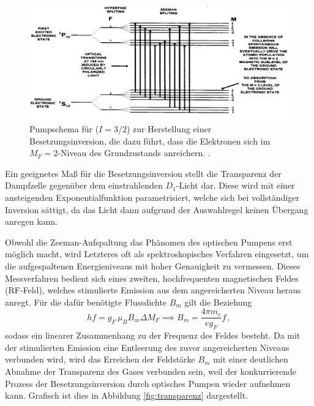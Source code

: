  \begin{figure}
    \centering
    \includegraphics[width=\textwidth]{pictures/pumpschema.png}
    \caption{Pumpschema für  ($I=3/2$) zur Herstellung einer Besetzungsinversion, die dazu führt, dass die Elektronen sich im $M_F=2$-Niveau des Grundzustands anreichern. \cite{caltech}.}
    \label{fig:pumpschema}
  \end{figure}

  Ein geeignetes Maß für die Besetzungsinversion stellt die Transparenz der Dampfzelle gegenüber dem einstrahlenden $D_1$-Licht dar. Diese wird mit einer ansteigenden Exponentialfunktion parametrisiert, welche sich bei vollständiger Inversion sättigt, da das Licht dann aufgrund der Auswahlregel keinen Übergang anregen kann.

  Obwohl die Zeeman-Aufspaltung das Phänomen des optischen Pumpens erst möglich macht, wird Letzteres oft als spektroskopisches Verfahren eingesetzt, um die aufgespaltenen Energieniveaus mit hoher Genauigkeit zu vermessen. Dieses Messverfahren bedient sich eines zweiten, hochfrequenten magnetischen Feldes (RF-Feld), welches stimulierte Emission aus dem angereicherten Niveau heraus anregt. Für die dafür benötigte Flussdichte $B_m$ gilt die Beziehung
  \begin{equation}
    h f = g_F \, \mu_B B_m \Delta M_F \implies B_m = \frac{4 \pi m_e}{e g_F} f\,,
    \label{eqn:B_M_Theorie}
  \end{equation}
  sodass ein linearer Zusammenhang zu der Frequenz des Feldes besteht.
  Da mit der stimulierten Emission eine Entleerung des zuvor angereicherten Niveaus verbunden wird, wird das Erreichen der Feldstärke $B_m$ mit einer deutlichen Abnahme der Transparenz des Gases verbunden sein, weil der konkurrierende Prozess der Besetzungsinversion durch optisches Pumpen wieder aufnehmen kann. Grafisch ist dies in Abbildung \ref{fig:transparenz} dargestellt.

